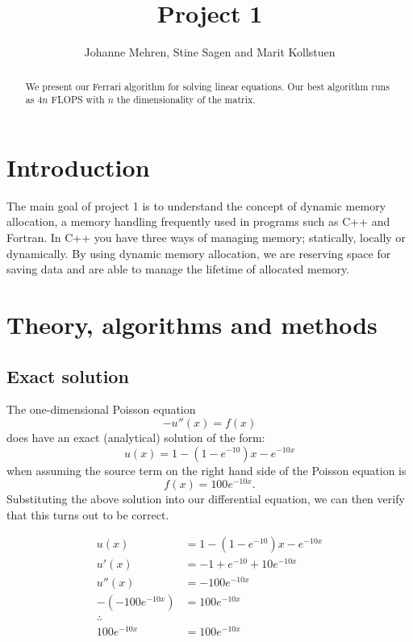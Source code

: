 \documentclass{article}
\title{Project 1}
\author{Johanne Mehren, Stine Sagen and Marit Kollstuen}
\begin{document}
\begin{abstract}
We present our Ferrari algorithm for solving linear equations. Our best algorithm runs as $4n$ FLOPS with $n$ the dimensionality of the matrix.
\end{abstract}


\maketitle

\section{Introduction}
The main goal of project 1 is to understand the concept of dynamic memory allocation, a memory handling frequently used in programs such as C++ and Fortran. In C++ you have three ways of managing memory; statically, locally or dynamically. By using dynamic memory allocation, we are reserving space for saving data and are able to manage the lifetime of allocated memory. 

\section{Theory, algorithms and methods}
\subsection{Exact solution}
The one-dimensional Poisson equation \begin{equation} -u''(x) = f(x) \end{equation} does have an exact (analytical) solution of the form: \begin{equation} u(x) = 1 - (1-e^{-10})x - e^{-10x} \end{equation} when assuming the source term on the right hand side of the Poisson equation is \begin{equation} f(x) = 100e^{-10x}. \end{equation} Substituting the above solution into our differential equation, we can then verify that this turns out to be correct. 

\begin{align*}
u(x)& = 1 - (1-e^{-10})x - e^{-10x}  \\
u'(x)& = -1 + e^{-10} + 10e^{-10x} \\
u''(x)& = -100e^{-10x}  \\
-(-100e^{-10x})& = 100e^{-10x} \\
\therefore \\
100e^{-10x}& = 100e^{-10x}
\end{align*}
\end{document}
